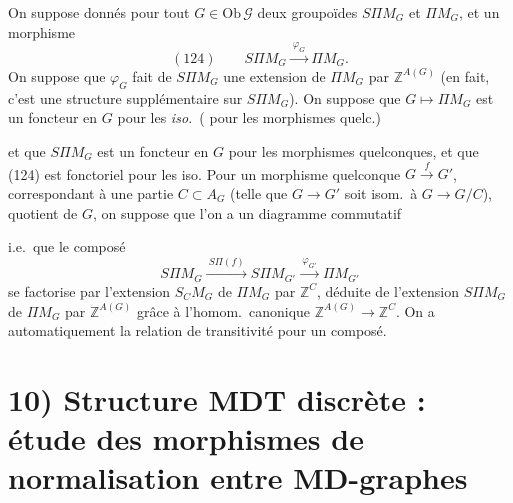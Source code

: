 \documentclass[11pt,a4paper]{article}
\begin{document}
On suppose donnés pour tout $G \in \mathrm{Ob}\,\mathcal{G}$ deux groupoïdes $S\Pi M_{G}$ et $\Pi M_{G}$, et un morphisme
\[
(124)\qquad S\Pi M_{G} \xrightarrow{\ \varphi_{G}\ } \Pi M_{G} .
\]
On suppose que $\varphi_{G}$ fait de $S\Pi M_{G}$ une extension de $\Pi M_{G}$ par $\mathbb{Z}^{A(G)}$ (en fait, c'est une structure supplémentaire sur $S\Pi M_{G}$). On suppose que $G \mapsto \Pi M_{G}$ est un foncteur en $G$ pour les \emph{iso.}\ ( pour les morphismes quelc.)

et que  $S\Pi M_{G}$ est un foncteur en \struck{\ill{}} $G$ pour les morphismes quelconques, et que (124) est fonctoriel pour les iso. Pour un morphisme quelconque $G \xrightarrow{f} G'$, correspondant à une partie $C \subset A_{G}$ (telle que $G \to G'$ soit isom.\ à $G \to G/C$), \struck{\ill{}} quotient de $G$, on suppose que l'on a un diagramme commutatif


i.e.\ que le composé
\[
S\Pi M_{G} \xrightarrow{\ S\Pi(f)\ } S\Pi M_{G'} \xrightarrow{\ \varphi_{G'}\ } \Pi M_{G'}
\]
se factorise par l'extension $S_{C}M_{G}$ de $\Pi M_{G}$ par $\mathbb{Z}^{C}$, déduite de l'extension $S\Pi M_{G}$ de $\Pi M_{G}$ par $\mathbb{Z}^{A(G)}$ grâce à l'homom.\ canonique $\mathbb{Z}^{A(G)} \to \mathbb{Z}^{C}$. On a automatiquement la relation de transitivité pour un composé.

\section{10) Structure MDT discrète : étude des morphismes de normalisation entre MD-graphes}
\end{document}
